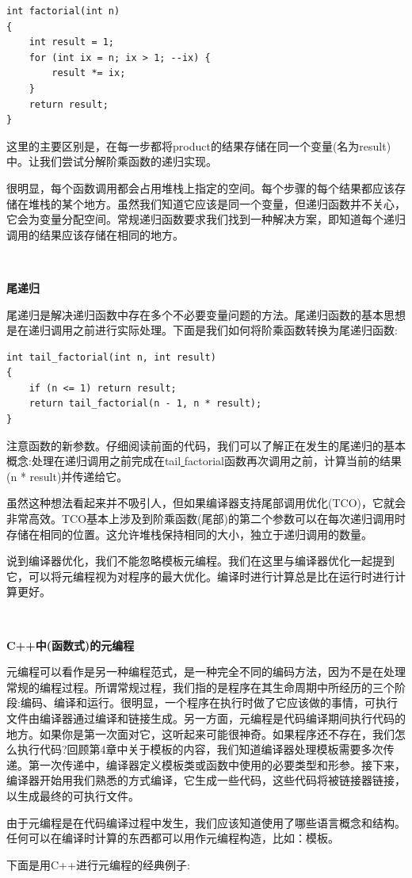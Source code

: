 \begin{lstlisting}[caption={}]
int factorial(int n)
{
	int result = 1;
	for (int ix = n; ix > 1; --ix) {
		result *= ix;
	}
	return result;
}
\end{lstlisting}

这里的主要区别是，在每一步都将product的结果存储在同一个变量(名为result)中。让我们尝试分解阶乘函数的递归实现。 \par
很明显，每个函数调用都会占用堆栈上指定的空间。每个步骤的每个结果都应该存储在堆栈的某个地方。虽然我们知道它应该是同一个变量，但递归函数并不关心，它会为变量分配空间。常规递归函数要求我们找到一种解决方案，即知道每个递归调用的结果应该存储在相同的地方。 \par

\noindent\textbf{}\ \par
\textbf{尾递归} \ \par
尾递归是解决递归函数中存在多个不必要变量问题的方法。尾递归函数的基本思想是在递归调用之前进行实际处理。下面是我们如何将阶乘函数转换为尾递归函数: \par

\begin{lstlisting}[caption={}]
int tail_factorial(int n, int result)
{
	if (n <= 1) return result;
	return tail_factorial(n - 1, n * result);
}
\end{lstlisting}

注意函数的新参数。仔细阅读前面的代码，我们可以了解正在发生的尾递归的基本概念:处理在递归调用之前完成在tail\underline{ }factorial函数再次调用之前，计算当前的结果(n * result)并传递给它。 \par
虽然这种想法看起来并不吸引人，但如果编译器支持尾部调用优化(TCO)，它就会非常高效。TCO基本上涉及到阶乘函数(尾部)的第二个参数可以在每次递归调用时存储在相同的位置。这允许堆栈保持相同的大小，独立于递归调用的数量。 \par
说到编译器优化，我们不能忽略模板元编程。我们在这里与编译器优化一起提到它，可以将元编程视为对程序的最大优化。编译时进行计算总是比在运行时进行计算更好。 \par

\noindent\textbf{}\ \par
\textbf{C++中(函数式)的元编程} \ \par
元编程可以看作是另一种编程范式，是一种完全不同的编码方法，因为不是在处理常规的编程过程。所谓常规过程，我们指的是程序在其生命周期中所经历的三个阶段:编码、编译和运行。很明显，一个程序在执行时做了它应该做的事情，可执行文件由编译器通过编译和链接生成。另一方面，元编程是代码编译期间执行代码的地方。如果你是第一次面对它，这听起来可能很神奇。如果程序还不存在，我们怎么执行代码?回顾第4章中关于模板的内容，我们知道编译器处理模板需要多次传递。第一次传递中，编译器定义模板类或函数中使用的必要类型和形参。接下来，编译器开始用我们熟悉的方式编译，它生成一些代码，这些代码将被链接器链接，以生成最终的可执行文件。 \par
由于元编程是在代码编译过程中发生，我们应该知道使用了哪些语言概念和结构。任何可以在编译时计算的东西都可以用作元编程构造，比如：模板。 \par
下面是用C++进行元编程的经典例子: \par

